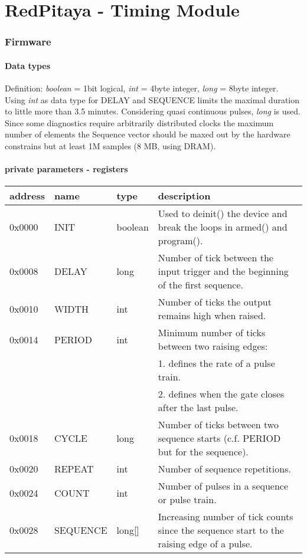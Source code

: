 \documentclass{article}
\begin{document}
\thispagestyle{empty}
\part*{\center RedPitaya - Timing Module}
\section*{Firmware}
\subsection*{Data types}
Definition: \textit{boolean} = 1bit logical, \textit{int} = 4byte integer, \textit{long} = 8byte integer.\\
Using \textit{int} as data type for DELAY and SEQUENCE limits the maximal duration to little more than 3.5 minutes. Considering quasi continuous pulses, \textit{long} is used.
Since some diagnostics require arbitrarily distributed clocks the maximum number of elements the Sequence vector should be maxed out by the hardware constrains but at least 1M samples (8 MB, using DRAM).
\subsection*{private parameters - registers}
\begin{tabular}{llll}
address&name&type&description\\\hline
0x0000&INIT&boolean&Used to deinit() the device and break the loops in armed() and program().\\
0x0008&DELAY&long&Number of tick between the input trigger and the beginning of the first sequence.\\
0x0010&WIDTH&int&Number of ticks the output remains high when raised.\\
0x0014&PERIOD&int&Minimum number of ticks between two raising edges:\\
&&& 1. defines the rate of a pulse train.\\
&&& 2. defines when the gate closes after the last pulse.\\
0x0018&CYCLE&long&Number of ticks between two sequence starts (c.f. PERIOD but for the sequence).\\
0x0020&REPEAT&int&Number of sequence repetitions.\\
0x0024&COUNT&int&Number of pulses in a sequence or pulse train.\\
0x0028&SEQUENCE&long[]&Increasing number of tick counts since the sequence start to the raising edge of a pulse.\\
\end{tabular}
\end{document}
